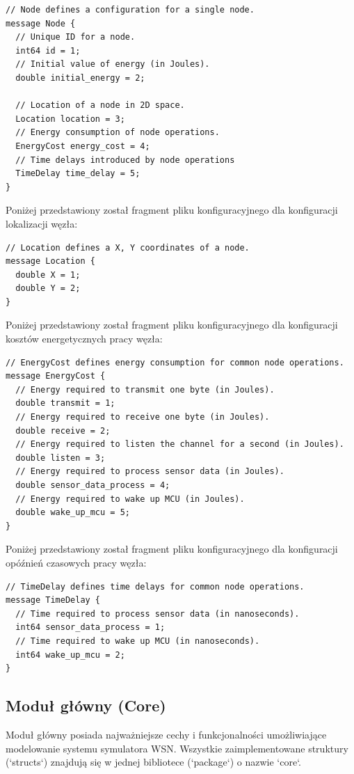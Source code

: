 \documentclass[a4paper,12pt,twoside,openany]{report}
\begin{document}
\begin{lstlisting}
// Node defines a configuration for a single node.
message Node {
  // Unique ID for a node.
  int64 id = 1;
  // Initial value of energy (in Joules). 
  double initial_energy = 2;

  // Location of a node in 2D space.
  Location location = 3;
  // Energy consumption of node operations.
  EnergyCost energy_cost = 4;
  // Time delays introduced by node operations
  TimeDelay time_delay = 5;
}
\end{lstlisting}

Poniżej przedstawiony został fragment pliku konfiguracyjnego dla konfiguracji lokalizacji węzła:

\begin{lstlisting}
// Location defines a X, Y coordinates of a node.
message Location {
  double X = 1;
  double Y = 2;
}
\end{lstlisting}

Poniżej przedstawiony został fragment pliku konfiguracyjnego dla konfiguracji kosztów energetycznych pracy węzła:

\begin{lstlisting}
// EnergyCost defines energy consumption for common node operations.
message EnergyCost {
  // Energy required to transmit one byte (in Joules).
  double transmit = 1;
  // Energy required to receive one byte (in Joules).
  double receive = 2;
  // Energy required to listen the channel for a second (in Joules).
  double listen = 3;
  // Energy required to process sensor data (in Joules).
  double sensor_data_process = 4;
  // Energy required to wake up MCU (in Joules).
  double wake_up_mcu = 5;
}
\end{lstlisting}

Poniżej przedstawiony został fragment pliku konfiguracyjnego dla konfiguracji opóźnień czasowych pracy węzła:

\begin{lstlisting}
// TimeDelay defines time delays for common node operations.
message TimeDelay {
  // Time required to process sensor data (in nanoseconds).
  int64 sensor_data_process = 1;
  // Time required to wake up MCU (in nanoseconds).
  int64 wake_up_mcu = 2;
}
\end{lstlisting}

\subsection{Moduł główny (Core)}

Moduł główny posiada najważniejsze cechy i funkcjonalności umożliwiające modelowanie systemu symulatora WSN.
Wszystkie zaimplementowane struktury (`structs`) znajdują się w jednej bibliotece (`package`) o nazwie `core`.
\end{document}
